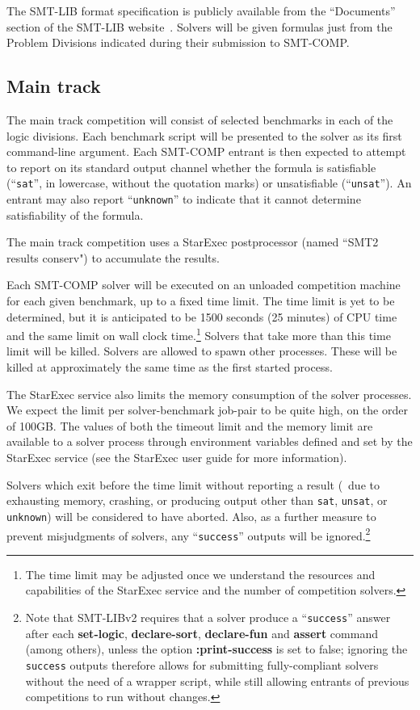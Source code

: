 \documentclass[12pt]{article}
\newcommand{\akey}[1]{\textbf{#1}}
\begin{document}
  
\noindent The SMT-LIB format specification is publicly
available from the ``Documents'' section of the SMT-LIB
website~\cite{SMT-LIB}.  Solvers will be given formulas just from the
Problem Divisions indicated during their submission to SMT-COMP.

\subsection{Main track}
\label{sec:exec:main}

The main track competition will consist of selected benchmarks in each of the
logic divisions.
Each benchmark script will be presented to the solver as its first command-line argument.
Each SMT-COMP entrant is then expected to attempt to report on its
standard output channel whether the formula is satisfiable
(``\texttt{sat}'', in lowercase, without the quotation marks) or unsatisfiable
(``\texttt{unsat}'').  An entrant may also report ``\texttt{unknown}''
to indicate that it cannot determine satisfiability of the formula.

The main track competition uses a StarExec postprocessor (named ``SMT2 results conserv") to accumulate the results.

Each SMT-COMP solver will be executed on an
unloaded competition machine for each given benchmark, up to a fixed
time limit.  The time limit is yet to be determined, but it is
anticipated to be 1500 seconds (25 minutes) of CPU time and the same limit on wall clock time.\footnote{The time limit may be adjusted once we understand the resources and capabilities of the StarExec service and the number of competition solvers.} 
Solvers that take more than this
time limit will be killed.  Solvers are allowed to spawn other
processes.  These will be killed at approximately the same time as the
first started process.

The StarExec service also limits the memory consumption of the solver processes. We expect the limit per solver-benchmark job-pair to be quite high, on the order of 100GB. The values of both the timeout limit and the memory limit are available to a solver process through environment variables defined and set by the StarExec service (see the StarExec user guide for more information).

Solvers which exit before the time
limit without reporting a result (\ie\ due to exhausting memory, crashing,
or producing output other than \texttt{sat}, \texttt{unsat}, or
\texttt{unknown})
will be considered to have aborted. 
Also, as a further measure to prevent misjudgments of solvers,
any  ``\texttt{success}'' outputs will be 
ignored.\footnote{
Note that SMT-LIBv2 requires that a solver produce a ``\texttt{success}'' answer
after each \akey{set-logic}, \akey{declare-sort}, \akey{declare-fun} and
\akey{assert} command (among others), unless the option
\akey{:print-success} is set to false; ignoring the
\texttt{success} outputs therefore allows for submitting fully-compliant
solvers without the need of a wrapper script, while still allowing entrants
of previous competitions to run without changes.}
\end{document}
